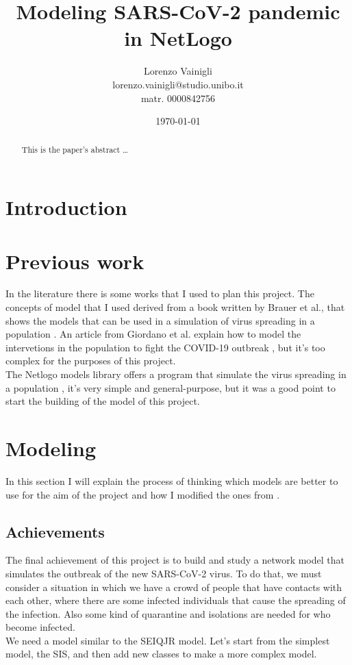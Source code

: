 \documentclass[12pt]{llncs}
\title{Modeling SARS-CoV-2 pandemic in NetLogo}
\author{Lorenzo Vainigli \\
lorenzo.vainigli@studio.unibo.it \\
matr. 0000842756}
\institute{Course of Complex Systems and Network Science \\
Laurea Magistrale in Informatica \\
University of Bologna \\
A.Y. 2020-2021}
\date{\today}
\begin{document}
{\def\addcontentsline#1#2#3{}\maketitle}

\begin{abstract}
This is the paper's abstract \ldots
\end{abstract}

\begingroup
\let\clearpage\relax
\renewcommand{\contentsname}{}
\setcounter{tocdepth}{2}
\tableofcontents
\endgroup

\section{Introduction}

\section{Previous work}\label{previous work}
In the literature there is some works that I used to plan this project. The concepts of model that I used derived from a book written by Brauer et al., that shows the models that can be used in a simulation of virus spreading in a population \cite{brauer}. An article from Giordano et al. explain how to model the intervetions in the population to fight the COVID-19 outbreak \cite{giordano}, but it's too complex for the purposes of this project.\\
The Netlogo \cite{netlogo} models library offers a program that simulate the virus spreading in a population \cite{netlogo-virus}, it's very simple and general-purpose, but it was a good point to start the building of the model of this project.

\section{Modeling}
In this section I will explain the process of thinking which models are better to use for the aim of the project and how I modified the ones from \cite{brauer}.

\subsection{Achievements}
The final achievement of this project is to build and study a network model that simulates the outbreak of the new SARS-CoV-2 virus. To do that, we must consider a situation in which we have a crowd of people that have contacts with each other, where there are some infected individuals that cause the spreading of the infection. Also some kind of quarantine and isolations are needed for who become infected. \\
We need a model similar to the SEIQJR model. Let's start from the simplest model, the SIS, and then add new classes to make a more complex model.
\end{document}
